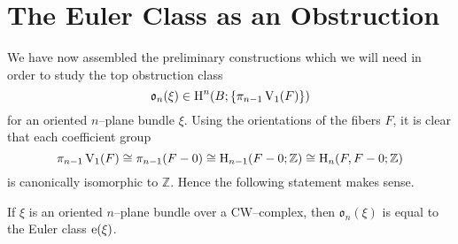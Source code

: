 \documentclass[../main]{subfiles}
\begin{document}
\section{The Euler Class as an Obstruction}
We have now assembled the preliminary constructions which we will need in order to study the top obstruction class \[{\mathfrak o}_n(\xi) \in \operatorname{H}^n(B; \{\pi_{n - 1} \operatorname{V}_1(F)\})\] for an oriented $n$--plane bundle $\xi$. Using the orientations of the fibers $F$, it is clear that each coefficient group \[\pi_{n - 1} \operatorname{V}_1(F) \cong \pi_{n - 1}(F - 0) \cong \operatorname{H}_{n - 1}(F - 0; \mathbb Z) \cong \operatorname{H}_n(F, F - 0; \mathbb Z)\] is canonically isomorphic to $\mathbb Z$. Hence the following statement makes sense.

\begin{theorem}
If $\xi$ is an oriented $n$--plane bundle over a CW--complex, then ${\mathfrak o}_n(\xi)$ is equal to the Euler class $\operatorname{e}(\xi)$. 
\end{theorem}
\end{document}
